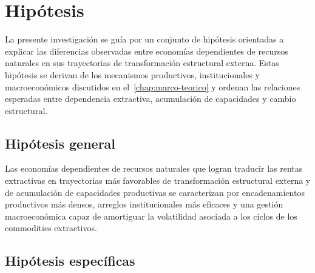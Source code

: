 \documentclass[../../PTFM.tex]{subfiles}
\begin{document}

	\chapter{Hipótesis}

	\label{chap:hipotesis}




	La presente investigación se guía por un conjunto de hipótesis orientadas a explicar las diferencias observadas entre economías dependientes de recursos naturales en sus trayectorias de transformación estructural externa. Estas hipótesis se derivan de los mecanismos productivos, institucionales y macroeconómicos discutidos en el~\autoref{chap:marco-teorico} y ordenan las relaciones esperadas entre dependencia extractiva, acumulación de capacidades y cambio estructural.



	\section{Hipótesis general}

	\label{sec:hipotesis-general}



	Las economías dependientes de recursos naturales que logran traducir las rentas extractivas en trayectorias más favorables de transformación estructural externa y de acumulación de capacidades productivas se caracterizan por encadenamientos productivos más densos, arreglos institucionales más eficaces y una gestión macroeconómica capaz de amortiguar la volatilidad asociada a los ciclos de los commodities extractivos.



	\section{Hipótesis específicas}

	\label{sec:hipotesis-especificas}
\end{document}
